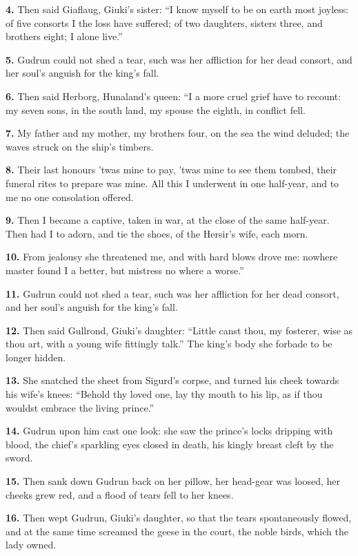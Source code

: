 \textbf{4.} Then said Giaflaug, Giuki's sister: ``I know myself to be on earth
most joyless: of five consorts I the loss have suffered; of two
daughters, sisters three, and brothers eight; I alone live.''

\textbf{5.} Gudrun could not shed a tear, such was her affliction for her
dead consort, and her soul's anguish for the king's fall.

\textbf{6.} Then said Herborg, Hunaland's queen: ``I a more cruel grief have
to recount: my seven sons, in the south land, my spouse the eighth, in
conflict fell.

\textbf{7.} My father and my mother, my brothers four, on the sea the wind
deluded; the waves struck on the ship's timbers.

\textbf{8.} Their last honours 'twas mine to pay, 'twas mine to see them
tombed, their funeral rites to prepare was mine. All this I underwent
in one half-year, and to me no one consolation offered.

\textbf{9.} Then I became a captive, taken in war, at the close of the same
half-year. Then had I to adorn, and tie the shoes, of the Hersir's
wife, each morn.

\textbf{10.} From jealousy she threatened me, and with hard blows drove me:
nowhere master found I a better, but mistress no where a worse.''

\textbf{11.} Gudrun could not shed a tear, such was her affliction for her
dead consort, and her soul's anguish for the king's fall.

\textbf{12.} Then said Gullrond, Giuki's daughter: ``Little canst thou, my
fosterer, wise as thou art, with a young wife fittingly talk.'' The
king's body she forbade to be longer hidden.

\textbf{13.} She snatched the sheet from Sigurd's corpse, and turned his cheek
towards his wife's knees: ``Behold thy loved one, lay thy mouth to his
lip, as if thou wouldst embrace the living prince.''

\textbf{14.} Gudrun upon him cast one look: she saw the prince's locks
dripping with blood, the chief's sparkling eyes closed in death, his
kingly breast cleft by the sword.

\textbf{15.} Then sank down Gudrun back on her pillow, her head-gear was
loosed, her cheeks grew red, and a flood of tears fell to her knees.

\textbf{16.} Then wept Gudrun, Giuki's daughter, so that the tears
spontaneously flowed, and at the same time screamed the geese in the
court, the noble birds, which the lady owned.

